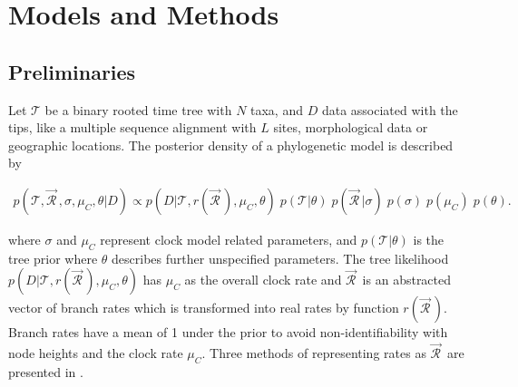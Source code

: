 \documentclass[10pt,letterpaper]{article}
\begin{document}







\section*{Models and Methods} \label{sect:models}



\subsection*{Preliminaries}



Let $\mathcal{T}$ be a binary rooted time tree with $N$ taxa, and %
$D$ data associated with the tips, like a multiple sequence alignment with $L$ sites, morphological data or geographic locations. 
The posterior density of a phylogenetic model is described by

\begin{eqnarray}
\label{eq:bayesian}
p(\mathcal{T}, \vec{\mathcal{R}}^{\,}, \sigma, \mu_C, \theta|D) \propto  p(D|\mathcal{T}, r(\vec{\mathcal{R}}^{\,}), \mu_C, \theta) \; p(\mathcal{T}|\theta) \;  p(\vec{\mathcal{R}}^{\,} | \sigma) \; p(\sigma) \; p(\mu_C) \; p(\theta).
\end{eqnarray}

\noindent
where $\sigma$ and $\mu_C$ represent clock model related parameters, and $p(\mathcal{T}|\theta)$ is the tree prior where $\theta$ describes further unspecified parameters. 
The tree likelihood $p(D|\mathcal{T}, r(\vec{\mathcal{R}}^{\,}), \mu_C,\theta)$ %
has $\mu_C$ as the overall clock rate and
$\vec{\mathcal{R}}^{\,}$ is an abstracted vector of branch rates which is transformed into real rates by function $r(\vec{\mathcal{R}}^{\,})$. 
Branch rates have a mean of 1 under the prior to avoid non-identifiability with node heights and the clock rate $\mu_C$.
Three methods of representing rates as $\vec{\mathcal{R}}^{\,}$ are presented in \textbf{}.  
\end{document}
